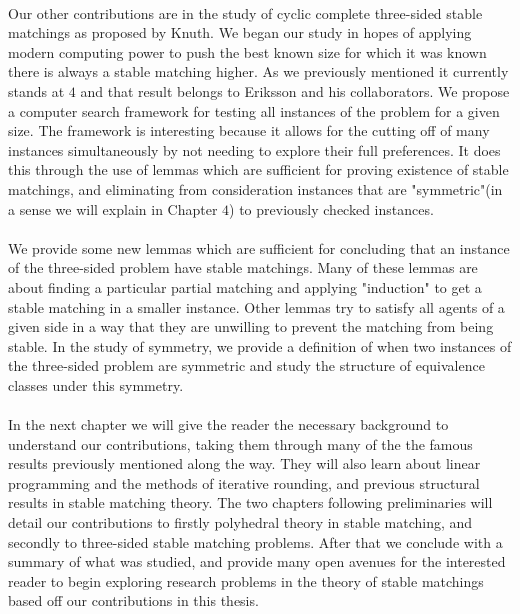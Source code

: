 \paragraph{}
Our other contributions are in the study of cyclic complete three-sided stable matchings as proposed by Knuth. We began our study in hopes of applying modern computing power to push the best known size for which it was known there is always a stable matching higher. As we previously mentioned it currently stands at $4$ and that result belongs to Eriksson and his collaborators. We propose a computer search framework for testing all instances of the problem for a given size. The framework is interesting because it allows for the cutting off of many instances simultaneously by not needing to explore their full preferences. It does this through the use of lemmas which are sufficient for proving existence of stable matchings, and eliminating from consideration instances that are "symmetric"(in a sense we will explain in Chapter $4$) to previously checked instances. 
\paragraph{}
We provide some new lemmas which are sufficient for concluding that an instance of the three-sided problem have stable matchings. Many of these lemmas are about finding a particular partial matching and applying "induction" to get a stable matching in a smaller instance. Other lemmas try to satisfy all agents of a given side in a way that they are unwilling to prevent the matching from being stable. In the study of symmetry, we provide a definition of when two instances of the three-sided problem are symmetric and study the structure of equivalence classes under this symmetry.
\paragraph{}
In the next chapter we will give the reader the necessary background to understand our contributions, taking them through many of the the famous results previously mentioned along the way. They will also learn about linear programming and the methods of iterative rounding, and previous structural results in stable matching theory. The two chapters following preliminaries will detail our contributions to firstly polyhedral theory in stable matching, and secondly to three-sided stable matching problems. After that we conclude with a summary of what was studied, and provide many open avenues for the interested reader to begin exploring research problems in the theory of stable matchings based off our contributions in this thesis.
